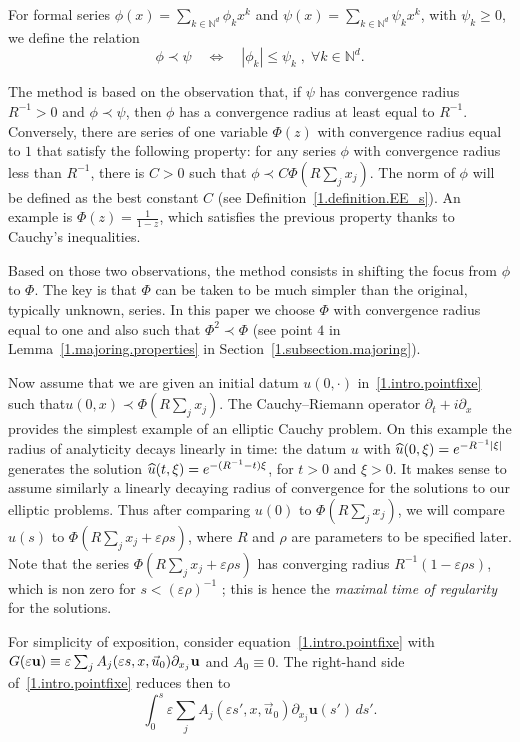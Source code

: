 \documentclass[10pt]{amsart}
\theoremstyle{definition}
\theoremstyle{plain}
\newcommand*\e{\varepsilon}
\newcommand*\N{{\mathbb N}}
\newcommand{\dptl}{\partial}%
\newcommand{\ubf}{{\mathbf u}}
\renewcommand*{\hat}[1]{\mathchoice{\widehat{#1}}{\widehat{#1}}{\oldhat{#1}}{\oldhat{#1}}}\let\oldforall\forall
\renewcommand*{\forall}{\mathrel{\oldforall}}
\begin{document}
For formal series $\phi(x) = \sum_{k\in\N^{d}} \phi_{k} x^{k}$ and $\psi(x) = \sum_{k\in\N^{d}} \psi_{k} x^{k}$, with $\psi_{k} \geq 0$, we define the relation
\[
\phi \prec \psi \quad \Longleftrightarrow \quad |\phi_{k}| \leq \psi_k \;, \; \forall k \in \N^{d}.
\]

The method is based on the observation that, if $\psi$ has convergence radius $R^{-1} >0$ and $\phi \prec \psi$, then $\phi$ has a convergence radius at least equal to $R^{-1}$. Conversely, there are series of one variable $\Phi(z)$ with convergence radius equal to $1$ that satisfy the following property: for any series $\phi$ with convergence radius less than $R^{-1}$, there is $C>0$ such that $\phi \prec C \Phi(R \sum_j x_j)$. The norm of $\phi$ will be defined as the best constant $C$ (see Definition~\ref{1.definition.EE_s}). An example is $\Phi(z) = \frac{1}{1 - z}$, which satisfies the previous property thanks to Cauchy's inequalities.

Based on those two observations, the method consists in shifting the focus from $\phi$ to $\Phi$. The key is that $\Phi$ can be taken to be much simpler than the original, typically unknown, series. In this paper we choose $\Phi$ with convergence radius equal to one and also such that $\Phi^2 \prec \Phi$ (see point $4$ in Lemma~\ref{1.majoring.properties} in Section~\ref{1.subsection.majoring}).

Now assume that we are given an initial datum $u(0,\cdot)$ in~\eqref{1.intro.pointfixe} such that\linebreak$u(0,x)\prec \Phi(R \sum_j x_j)$. The Cauchy--Riemann operator $\dptl_t + i\dptl_x$ provides the simplest example of an elliptic Cauchy problem. On this example the radius of analyticity decays linearly in time: the datum $u$ with $\hat{u}(0,\xi) = e^{-R^{-1}|\xi|}$ generates the solution $\hat{u}(t,\xi) = e^{-(R^{-1}-t)\xi}$, for $t > 0$ and $\xi > 0$. It makes sense to assume similarly a linearly decaying radius of convergence for the solutions to our elliptic problems. Thus after comparing $u(0)$ to $\Phi(R \sum_j x_j)$, we will compare $u(s)$ to $\Phi(R \sum_j x_j + \e\rho s)$, where $R$ and $\rho$ are parameters to be specified later. Note that the series $\Phi(R \sum_j x_j + \e\rho s)$ has converging radius $R^{-1}(1 - \e \rho s)$, which is non zero for $s < (\e \rho)^{-1}$ ; this is hence the \emph{maximal time of regularity} for the solutions.

For simplicity of exposition, consider equation~\eqref{1.intro.pointfixe} with $G(\e\ubf) \equiv \e \sum_j A_j(\e s,x,\vec{u}_0)\linebreak\dptl_{x_j}\ubf$ and $A_0 \equiv 0$. The right-hand side of~\eqref{1.intro.pointfixe} reduces then to
\begin{equation}\label{1.intro.def.rhs}
\int_{0}^{s} \e \sum_j A_j(\e s',x, \vec{u}_0)\dptl_{x_j} \ubf(s') \,ds'.
\end{equation}
\end{document}
